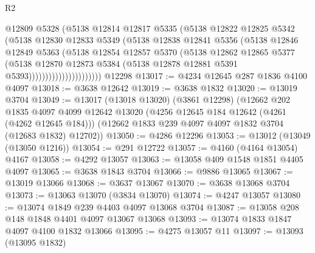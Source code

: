 \begin{lexlean}{R2}
\begin{coremodule}
                              @12809
                              @5328
                              (@5138
                                @12814
                                @12817
                                @5335
                                (@5138
                                  @12822
                                  @12825
                                  @5342
                                  (@5138
                                    @12830
                                    @12833
                                    @5349
                                    (@5138
                                      @12838
                                      @12841
                                      @5356
                                      (@5138
                                        @12846
                                        @12849
                                        @5363
                                        (@5138
                                          @12854
                                          @12857
                                          @5370
                                          (@5138
                                            @12862
                                            @12865
                                            @5377
                                            (@5138
                                              @12870
                                              @12873
                                              @5384
                                              (@5138 @12878 @12881 @5391 @5393))))))))))))))))))))))
    @12298
@13017 := @4234 @12645 @287 @1836 @4100 @4097
@13018 := @3638 @12642
@13019 := @3638 @1832
@13020 := @13019 @3704
@13049 := @13017
    (@13018 @13020)
    (@3861 @12298)
    (@12662
      @202
      @1835
      @4097
      @4099
      @12642
      @13020
      (@4256 @12645 @184 @12642 (@4261 (@4262 @12645 @184)))
      (@12662 @1833 @239 @4097 @4097 @1832 @3704 (@12683 @1832) @12702))
@13050 := @4286 @12296
@13053 := @13012 (@13049 (@13050 @1216))
@13054 := @291 @12722
@13057 := @4160 (@4164 @13054) @4167
@13058 := @4292 @13057
@13063 := @13058 @409 @1548 @1851 @4405 @4097
@13065 := @3638 @1843 @3704
@13066 := @9886 @13065
@13067 := @13019 @13066
@13068 := @3637 @13067
@13070 := @3638 @13068 @3704
@13073 := @13063 @13070 (@3834 @13070)
@13074 := @4247 @13057
@13080 := @13074 @1849 @239 @4403 @4097 @13068 @3704
@13087 := @13058 @208 @148 @1848 @4401 @4097 @13067 @13068
@13093 := @13074 @1833 @1847 @4097 @4100 @1832 @13066
@13095 := @4275 @13057 @11
@13097 := @13093 (@13095 @1832)

\end{coremodule}
\end{lexlean}
